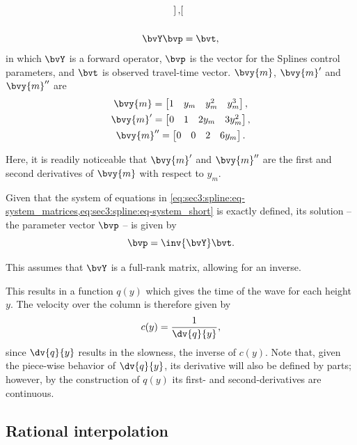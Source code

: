 \begin{subequations}
\begin{gather}
\begin{bmatrix}
		\end{bmatrix}, \label{eq:sec3:spline:eq-system_matrices} \\[0.5cm]
		\bvY \bvp = \bvt, \label{eq:sec3:spline:eq-system_short}
	\end{gather}
\end{subequations}
in which $\bvY$ is a forward operator, $\bvp$ is the vector for the Splines control parameters, and $\bvt$ is observed travel-time vector. $\bvy{m}$, $\bvy{m}'$ and $\bvy{m}''$ are
\begin{subequations}
\begin{gather}
	\bvy{m} = \begin{bmatrix}
		1 & y_m & y_m^2 & y_m^3
	\end{bmatrix}, \\
	\bvy{m}' = \begin{bmatrix}
		0 & 1 & 2 y_m & 3 y_m^2
	\end{bmatrix}, \\
	\bvy{m}'' = \begin{bmatrix}
		0 & 0 & 2 & 6 y_m
	\end{bmatrix}.
\end{gather}
\end{subequations}

Here, it is readily noticeable that $\bvy{m}'$ and $\bvy{m}''$ are the first and second derivatives of $\bvy{m}$ with respect to $y_m$.

Given that the system of equations in \cref{eq:sec3:spline:eq-system_matrices,eq:sec3:spline:eq-system_short} is exactly defined, its solution -- the parameter vector $\bvp$ -- is given by
\begin{equation}
\bvp = \inv{\bvY} \bvt.
\end{equation}

This assumes that $\bvY$ is a full-rank matrix, allowing for an inverse.

This results in a function $q(y)$ which gives the time of the wave for each height $y$. The velocity over the column is therefore given by
\begin{equation}
	c(y) = \frac{1}{\dv{q}{y}},
\end{equation}
since $\dv{q}{y}$ results in the slowness, the inverse of $c(y)$. Note that, given the piece-wise behavior of $\dv{q}{y}$, its derivative will also be defined by parts; however, by the construction of $q(y)$ its first- and second-derivatives are continuous.

\subsection{Rational interpolation}

